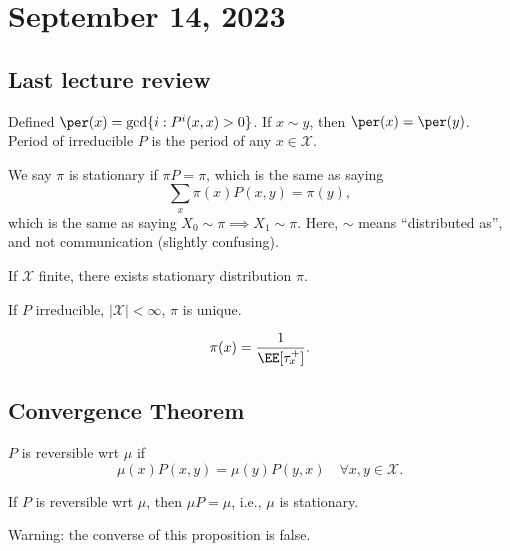 \section{September 14, 2023}

\subsection{Last lecture review}

Defined $\per(x) = \gcd \{i : P^i(x,x)>0\}$. If $x\sim y$, then $\per(x) = \per(y)$. Period of irreducible $P$ is the period of any $x\in \mathcal{X}$.

We say $\pi$ is stationary if $\pi P = \pi$, which is the same as saying 
\[\sum_x \pi(x) P(x,y) = \pi(y),\]
which is the same as saying $X_0\sim \pi \implies X_1\sim \pi$. Here, $\sim$ means ``distributed as'', and not communication (slightly confusing).  

\begin{theorem}
\thmlabel

If $\mathcal{X}$ finite, there exists stationary distribution $\pi$.
\end{theorem}

\begin{theorem}
\thmlabel

If $P$ irreducible, $\vert \mathcal{X}\vert < \infty$, $\pi$ is unique. 
\end{theorem}

\begin{theorem}
\corlabel

\[\pi(x) = \frac{1}{\EE[\tau_x^+]}.\]
\end{theorem}

\subsection{Convergence Theorem}

\begin{definition}

$P$ is \ac{reversible} wrt $\mu$ if 
\[\mu(x)P(x,y) = \mu(y)P(y,x)\quad \forall x,y\in \mathcal{X}.\]
\end{definition}

\begin{theorem}
\proplabel

If $P$ is reversible wrt $\mu$, then $\mu P=\mu$, i.e., $\mu$ is stationary. 
\end{theorem}

Warning: the converse of this proposition is false.

